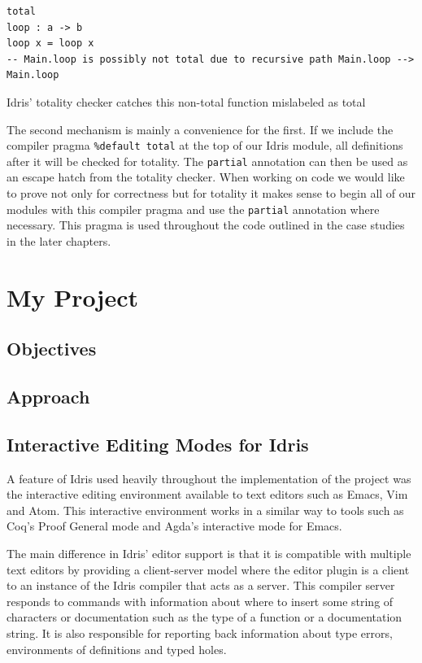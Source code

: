 \documentclass[a4paper, notitlepage]{report}
\begin{document}
\begin{listing}[H]
\begin{verbatim}
total
loop : a -> b
loop x = loop x
-- Main.loop is possibly not total due to recursive path Main.loop --> Main.loop
\end{verbatim}
\caption{Idris' totality checker catches this non-total function mislabeled as total}
\end{listing}

The second mechanism is mainly a convenience for the first. If we include the
compiler pragma \texttt{\%default total} at the top of our Idris module, all definitions
after it will be checked for totality. The \texttt{partial} annotation can then be used
as an escape hatch from the totality checker. When working on code we would like
to prove not only for correctness but for totality it makes sense to begin all
of our modules with this compiler pragma and use the \texttt{partial} annotation where
necessary. This pragma is used throughout the code outlined in the case studies
in the later chapters.
\chapter{My Project}
\label{sec:orgff45706}

\section{Objectives}
\label{sec:org9f5d7a0}

\section{Approach}
\label{sec:orgdbc1c64}

\section{Interactive Editing Modes for Idris}
\label{sec:org5026ccc}
A feature of Idris used heavily throughout the implementation of the project was
the interactive editing environment available to text editors such as Emacs, Vim
and Atom. This interactive environment works in a similar way to tools such as
Coq's Proof General \cite{proof_general} mode and Agda's interactive mode for
Emacs.

The main difference in Idris' editor support is that it is compatible with
multiple text editors by providing a client-server model where the editor plugin
is a client to an instance of the Idris compiler that acts as a server. This
compiler server responds to commands with information about where to insert some
string of characters or documentation such as the type of a function or a
documentation string. It is also responsible for reporting back information
about type errors, environments of definitions and typed holes.
\end{document}
